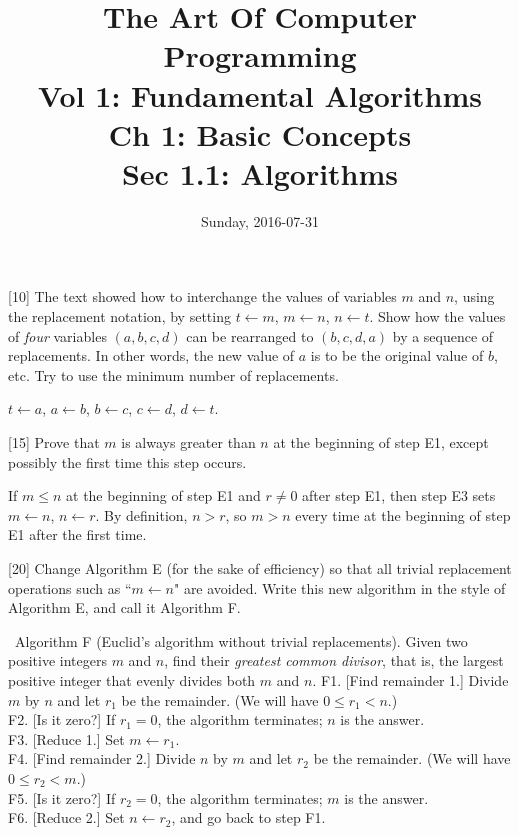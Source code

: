 \documentclass{amsart}
\title{The Art Of Computer Programming\\Vol 1: Fundamental Algorithms\\Ch 1: Basic Concepts\\Sec 1.1: Algorithms}
\date{Sunday, 2016-07-31}
\begin{document}
\maketitle

\begin{problem}{[}10{]}
  The text showed how to interchange the values of variables \(m\) and \(n\),
  using the replacement notation, by setting \(t \gets m\), \(m \gets n\),
  \(n \gets t\).  Show how the values of \emph{four} variables
  \((a, b, c, d)\) can be rearranged to \((b, c, d, a)\) by a sequence of
  replacements.  In other words, the new value of \(a\) is to be the original
  value of \(b\), etc.  Try to use the minimum number of replacements.
\end{problem}

\begin{solution}
  \(t \gets a\), \(a \gets b\), \(b \gets c\), \(c \gets d\), \(d \gets t\).
\end{solution}

\begin{problem} {[}15{]}
  Prove that \(m\) is always greater than \(n\) at the beginning of step E1,
  except possibly the first time this step occurs.
\end{problem}

\begin{solution}
  If \(m \leq n\) at the beginning of step E1 and \(r \neq 0\) after step E1,
  then step E3 sets \(m \gets n\), \(n \gets r\).  By definition, \(n > r\), so
  \(m > n\) every time at the beginning of step E1 after the first time.
\end{solution}

\begin{problem}{[}20{]}
  Change Algorithm E (for the sake of efficiency) so that all trivial
  replacement operations such as ``\(m \gets n\)" are avoided.  Write this new
  algorithm in the style of Algorithm E, and call it Algorithm F.
\end{problem}

\begin{solution}
\
  \algbegin Algorithm F (Euclid's algorithm without trivial replacements).  Given two
  positive integers \(m\) and \(n\), find their \emph{greatest common divisor},
  that is, the largest positive integer that evenly divides both \(m\) and
  \(n\).
  \algstep F1. [Find remainder 1.] Divide \(m\) by \(n\) and let \(r_1\) be the
  remainder.  (We will have \(0 \leq r_1 < n\).) \\
  \algstep F2. [Is it zero?] If \(r_1 = 0\), the algorithm terminates; \(n\) is the answer. \\
  \algstep F3. [Reduce 1.] Set \(m \gets r_1\). \\
  \algstep F4. [Find remainder 2.] Divide \(n\) by \(m\) and let \(r_2\) be the
  remainder.  (We will have \(0 \leq r_2 < m\).) \\
  \algstep F5. [Is it zero?] If \(r_2 = 0\), the algorithm terminates; \(m\) is the answer. \\
  \algstep F6. [Reduce 2.] Set \(n \gets r_2\), and go back to step F1. \slug
\end{solution}
\end{document}
